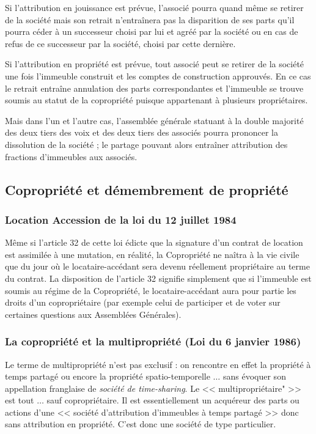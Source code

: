 \begin{enumerate}[label=\arabic*)]
\begin{enumerate}[label=\roman*)]
			Si l’attribution en jouissance est prévue, l’associé pourra quand même se retirer de la société mais son
			retrait n'entraînera pas la disparition de ses parts qu'il pourra céder à un successeur choisi par lui et agréé
			par la société ou en cas de refus de ce successeur par la société, choisi par cette dernière.
		
			Si l’attribution en propriété est prévue, tout associé peut se retirer de la société une fois l’immeuble
			construit et les comptes de construction approuvés. En ce cas le retrait entraîne annulation des parts
			correspondantes et l'immeuble se trouve soumis au statut de la copropriété puisque appartenant à
			plusieurs propriétaires.
			
			Mais dans l'un et l'autre cas, l'assemblée générale statuant à la double majorité des deux tiers des voix et
			des deux tiers des associés pourra prononcer la dissolution de la société ; le partage pouvant alors
			entraîner attribution des fractions d'immeubles aux associés.
		\end{enumerate}
	\end{enumerate}
	
	\subsection{Copropriété et démembrement de propriété}
	
		\subsubsection{Location Accession de la loi du 12 juillet 1984}
			
			Même si l'article 32 de cette loi édicte que la signature d'un contrat de location est assimilée à une
			mutation, en réalité, la Copropriété ne naîtra à la vie civile que du jour où le locataire-accédant sera devenu
			réellement propriétaire au terme du contrat. La disposition de l'article 32 signifie simplement que si
			l'immeuble est soumis au régime de la Copropriété, le locataire-accédant aura pour partie les droits d'un
			copropriétaire (par exemple celui de participer et de voter sur certaines questions aux Assemblées
			Générales).
		
		\subsubsection{La copropriété et la multipropriété (Loi du 6 janvier 1986)}
	
			Le terme de multipropriété n'est pas exclusif : on rencontre en effet la propriété à temps partagé ou encore
			la propriété spatio-temporelle $\dots$ sans évoquer son appellation franglaise de \emph{société de time-sharing}.
			Le << multipropriétaire" >> est tout $\dots$ sauf copropriétaire. Il est essentiellement un acquéreur des parts ou
			actions d'une << société d'attribution d'immeubles à temps partagé >> donc sans attribution en propriété.
			C'est donc une société de type particulier.
	
